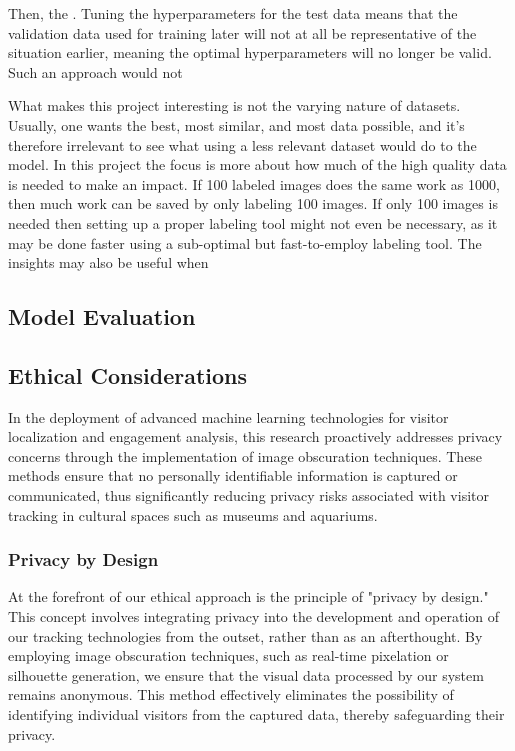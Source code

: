 Then, the . Tuning the hyperparameters for the test data means that the validation data used for training later will not at all be representative of the situation earlier, meaning the optimal hyperparameters will no longer be valid. Such an approach would not

What makes this project interesting is not the varying nature of datasets. Usually, one wants the best, most similar, and most data possible, and it's therefore irrelevant to see what using a less relevant dataset would do to the model. In this project the focus is more about how much of the high quality data is needed to make an impact. If 100 labeled images does the same work as 1000, then much work can be saved by only labeling 100 images. If only 100 images is needed then setting up a proper labeling tool might not even be necessary, as it may be done faster using a sub-optimal but fast-to-employ labeling tool. The insights may also be useful when

\subsection{Model Evaluation}


\subsection{Ethical Considerations}
In the deployment of advanced machine learning technologies for visitor localization and engagement analysis, this research proactively addresses privacy concerns through the implementation of image obscuration techniques. These methods ensure that no personally identifiable information is captured or communicated, thus significantly reducing privacy risks associated with visitor tracking in cultural spaces such as museums and aquariums.

\subsubsection{Privacy by Design}
At the forefront of our ethical approach is the principle of "privacy by design." This concept involves integrating privacy into the development and operation of our tracking technologies from the outset, rather than as an afterthought. By employing image obscuration techniques, such as real-time pixelation or silhouette generation, we ensure that the visual data processed by our system remains anonymous. This method effectively eliminates the possibility of identifying individual visitors from the captured data, thereby safeguarding their privacy.

